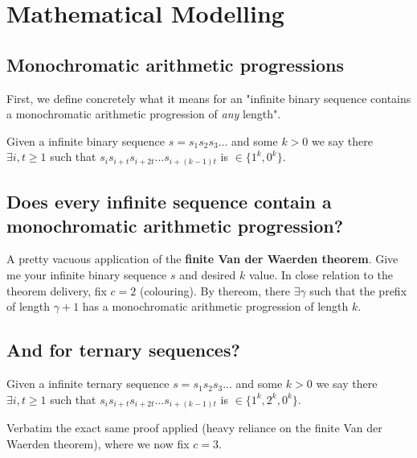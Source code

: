 \documentclass{article}
\begin{document}
\pagebreak

\section{Mathematical Modelling}
\subsection{Monochromatic arithmetic progressions}
First, we define concretely what it means for an "infinite binary sequence contains a monochromatic arithmetic progression of \emph{any} length". 

Given a infinite binary sequence $s = s_{1}s_{2}s_{3}...$ and some $k>0$ we say there $\exists i,t \geq 1$ such that $s_{i}s_{i+t}s_{i+2t}...s_{i+(k-1)t}$ is $\in \{1^k,0^k\}$.

\subsection{Does every infinite sequence contain a monochromatic arithmetic progression?}
A pretty vacuous application of the \textbf{finite Van der Waerden theorem}. Give me your infinite binary sequence $s$ and desired $k$ value. In close relation to the theorem delivery, fix $c = 2$ (colouring). By thereom, there $\exists \gamma$ such that the prefix of length $\gamma + 1$ has a monochromatic arithmetic progression of length $k$.

\subsection{And for ternary sequences?} 
Given a infinite ternary sequence $s = s_{1}s_{2}s_{3}...$ and some $k>0$ we say there $\exists i,t \geq 1$ such that $s_{i}s_{i+t}s_{i+2t}...s_{i+(k-1)t}$ is $\in \{1^k,2^k,0^k\}$.

Verbatim the exact same proof applied (heavy reliance on the finite Van der Waerden theorem), where we now fix $c = 3$.
\end{document}
